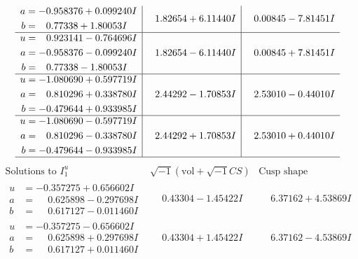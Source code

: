 \documentclass[1p]{elsarticle_modified}
\theoremstyle{definition}
\newcommand{\I}{\sqrt{-1}}
\begin{document}
$$\begin{array}{c|c|c}
\begin{aligned}
a &= -0.958376 + 0.099240 I \\
b &= \phantom{-}0.77338 + 1.80053 I\end{aligned}
 & \phantom{-}1.82654 + 6.11440 I & \phantom{-}0.00845 - 7.81451 I \\ \hline\begin{aligned}
u &= \phantom{-}0.923141 - 0.764696 I \\
a &= -0.958376 - 0.099240 I \\
b &= \phantom{-}0.77338 - 1.80053 I\end{aligned}
 & \phantom{-}1.82654 - 6.11440 I & \phantom{-}0.00845 + 7.81451 I \\ \hline\begin{aligned}
u &= -1.080690 + 0.597719 I \\
a &= \phantom{-}0.810296 + 0.338780 I \\
b &= -0.479644 + 0.933985 I\end{aligned}
 & \phantom{-}2.44292 - 1.70853 I & \phantom{-}2.53010 - 0.44010 I \\ \hline\begin{aligned}
u &= -1.080690 - 0.597719 I \\
a &= \phantom{-}0.810296 - 0.338780 I \\
b &= -0.479644 - 0.933985 I\end{aligned}
 & \phantom{-}2.44292 + 1.70853 I & \phantom{-}2.53010 + 0.44010 I\\
 \hline 
 \end{array}$$\newpage$$\begin{array}{c|c|c}  
\text{Solutions to }I^u_{1}& \I (\text{vol} + \sqrt{-1}CS) & \text{Cusp shape}\\
 \hline 
\begin{aligned}
u &= -0.357275 + 0.656602 I \\
a &= \phantom{-}0.625898 - 0.297698 I \\
b &= \phantom{-}0.617127 - 0.011460 I\end{aligned}
 & \phantom{-}0.43304 - 1.45422 I & \phantom{-}6.37162 + 4.53869 I \\ \hline\begin{aligned}
u &= -0.357275 - 0.656602 I \\
a &= \phantom{-}0.625898 + 0.297698 I \\
b &= \phantom{-}0.617127 + 0.011460 I\end{aligned}
 & \phantom{-}0.43304 + 1.45422 I & \phantom{-}6.37162 - 4.53869 I \\ \hline\begin{aligned}

\end{aligned}
\end{array}$$
\end{document}
